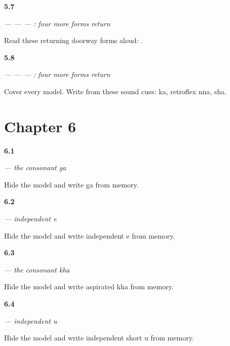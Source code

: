 \noindent\begin{minipage}[t]{\linewidth}
\raggedright
\hypertarget{review-GU-R05-second-four-r1-doorway-three-r2-reading}{\textbf{5.7}} \emph{ —  —  — : four more forms return}\par
\small Read these returning doorway forms aloud:   .
\end{minipage}\par\medskip

\noindent\begin{minipage}[t]{\linewidth}
\raggedright
\hypertarget{review-GU-R05-second-four-r1-doorway-three-r2-dictation}{\textbf{5.8}} \emph{ —  —  — : four more forms return}\par
\small Cover every model. Write from these sound cues: ka, retroflex nna, sha.
\end{minipage}\par\medskip

\section*{Chapter 6}

\noindent\begin{minipage}[t]{\linewidth}
\raggedright
\hypertarget{review-GU-W06-ga-recall}{\textbf{6.1}} \emph{ — the consonant ga}\par
\small Hide the model and write ga from memory.
\end{minipage}\par\medskip

\noindent\begin{minipage}[t]{\linewidth}
\raggedright
\hypertarget{review-GU-W06-independent-e-recall}{\textbf{6.2}} \emph{ — independent e}\par
\small Hide the model and write independent e from memory.
\end{minipage}\par\medskip

\noindent\begin{minipage}[t]{\linewidth}
\raggedright
\hypertarget{review-GU-W06-kha-recall}{\textbf{6.3}} \emph{ — the consonant kha}\par
\small Hide the model and write aspirated kha from memory.
\end{minipage}\par\medskip

\noindent\begin{minipage}[t]{\linewidth}
\raggedright
\hypertarget{review-GU-W06-independent-u-recall}{\textbf{6.4}} \emph{ — independent u}\par
\small Hide the model and write independent short u from memory.
\end{minipage}\par\medskip

